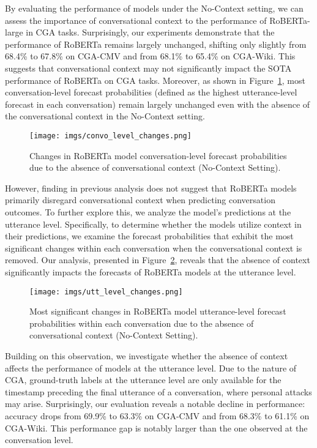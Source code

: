 %
By evaluating the performance of models under the No-Context setting, we can assess the importance of conversational context to the performance of RoBERTa-large in CGA tasks. 
%
Surprisingly, our experiments demonstrate that the performance of RoBERTa remains largely unchanged, shifting only slightly from 68.4\% to 67.8\% on CGA-CMV and from 68.1\% to 65.4\% on CGA-Wiki. 
%
This suggests that conversational context may not significantly impact the SOTA performance of RoBERTa on CGA tasks.
%
Moreover, as shown in Figure~\ref{fig:convo_level_changes}, most conversation-level forecast probabilities (defined as the highest utterance-level forecast in each conversation) remain largely unchanged even with the absence of the conversational context in the No-Context setting.
\begin{figure}[ht]
    \centering
    \texttt{[image: imgs/convo\_level\_changes.png]}
    \caption{
        Changes in RoBERTa model conversation-level forecast probabilities due to the absence of conversational context (No-Context Setting).}
    \label{fig:convo_level_changes}
\end{figure}
However, finding in previous analysis does not suggest that RoBERTa models primarily disregard conversational context when predicting conversation outcomes. 
%
To further explore this, we analyze the model's predictions at the utterance level. 
%
Specifically, to determine whether the models utilize context in their predictions, we examine the forecast probabilities that exhibit the most significant changes within each conversation when the conversational context is removed. 
%
Our analysis, presented in Figure~\ref{fig:utt_level_changes}, reveals that the absence of context significantly impacts the forecasts of RoBERTa models at the utterance level.

\begin{figure}[ht]
    \centering
    \texttt{[image: imgs/utt\_level\_changes.png]}
    \caption{Most significant changes in RoBERTa model utterance-level forecast probabilities within each conversation due to the absence of conversational context (No-Context Setting).}
    \label{fig:utt_level_changes}
\end{figure}

Building on this observation, we investigate whether the absence of context affects the performance of models at the utterance level. 
%
Due to the nature of CGA, ground-truth labels at the utterance level are only available for the timestamp preceding the final utterance of a conversation, where personal attacks may arise. 
%
Surprisingly, our evaluation reveals a notable decline in performance: accuracy drops from 69.9\% to 63.3\% on CGA-CMV and from 68.3\% to 61.1\% on CGA-Wiki. 
%
This performance gap is notably larger than the one observed at the conversation level.

